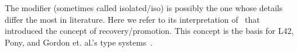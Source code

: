 






The \Q@capsule@ modifier (sometimes called isolated/iso) is possibly the one whose details differ the most in literature. Here we refer to its interpretation of~\cite{GordonEtAl12} that introduced the concept of recovery/promotion.
This concept is the basis for L42, Pony, and Gordon et. al.'s type systems~\cite{GordonEtAl12,ServettoEtAl13a,ServettoZucca15,ServettoEtAl13a,clebsch2015deny,clebsch2017orca}. 


